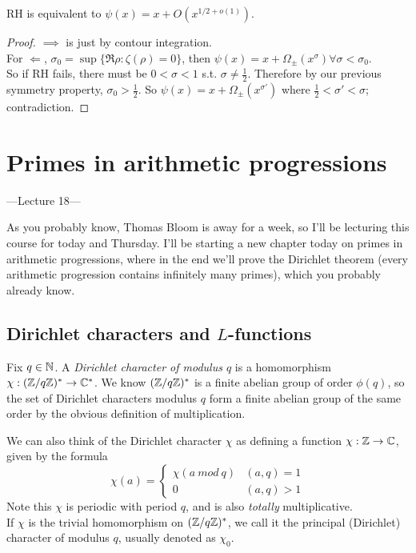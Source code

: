 \documentclass[a4paper]{article}
\begin{document}
\begin{thm}
RH is equivalent to $\psi(x) = x+O(x^{1/2+o(1)})$.
\begin{proof}
$\implies$ is just by contour integration.\\
For $\Leftarrow$, $\sigma_0=\sup\{\Re \rho: \zeta(\rho) = 0\}$, then $\psi(x) = x+\Omega_\pm(x^\sigma) \forall \sigma<\sigma_0$.\\
So if RH fails, there must be $0<\sigma<1$ s.t. $\sigma \neq \frac{1}{2}$. Therefore by our previous symmetry property, $\sigma_0 > \frac{1}{2}$. So $\psi(x) = x+\Omega_\pm(x^{\sigma'})$ where $\frac{1}{2} < \sigma' < \sigma$; contradiction.
\end{proof}
\end{thm}

\newpage

\section{Primes in arithmetic progressions}

---Lecture 18---

As you probably know, Thomas Bloom is away for a week, so I'll be lecturing this course for today and Thursday. I'll be starting a new chapter today on primes in arithmetic progressions, where in the end we'll prove the Dirichlet theorem (every arithmetic progression contains infinitely many primes), which you probably already know.

\subsection{Dirichlet characters and $L$-functions}

Fix $q \in \mathbb{N}$. A \emph{Dirichlet character of modulus $q$} is a homomorphism $\chi: (\mathbb{Z}/q\mathbb{Z})^* \to \mathbb{C}^*$. We know $(\mathbb{Z}/q\mathbb{Z})^*$ is a finite abelian group of order $\phi(q)$, so the set of Dirichlet characters modulus $q$ form a finite abelian group of the same order by the obvious definition of multiplication.

We can also think of the Dirichlet character $\chi$ as defining a function $\chi:\mathbb{Z} \to \mathbb{C}$, given by the formula
\[
\chi(a) = \left\{
\begin{array}{ll}
\chi(a\ mod\ q) & (a,q)=1\\
0 & (a,q)>1
\end{array}
\right.
\]
Note this $\chi$ is periodic with period $q$, and is also \emph{totally} multiplicative.\\
If $\chi$ is the trivial homomorphism on $(\mathbb{Z}/q\mathbb{Z})^*$, we call it the principal (Dirichlet) character of modulus $q$, usually denoted as $\chi_0$.
\end{document}
